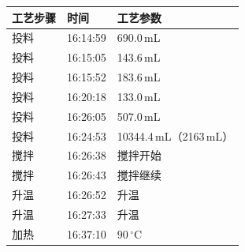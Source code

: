 \documentclass[UTF8,10pt,a4paper,fontset=fandol]{ctexart}
\newcommand{\fieldvalue}[1]{#1}
\begin{document}
\begin{tabularx}{\textwidth}{@{}l l X@{}}
\textbf{工艺步骤} & \textbf{时间} & \textbf{工艺参数} \\
\hline
投料 & 
\fieldvalue{16:14:59} &
\fieldvalue{690.0\,mL} \\

投料 & 
\fieldvalue{16:15:05} &
\fieldvalue{143.6\,mL} \\

投料 & 
\fieldvalue{16:15:52} &
\fieldvalue{183.6\,mL} \\

投料 & 
\fieldvalue{16:20:18} &
\fieldvalue{133.0\,mL} \\

投料 & 
\fieldvalue{16:26:05} &
\fieldvalue{507.0\,mL} \\

投料 & 
\fieldvalue{16:24:53} &
\fieldvalue{10344.4\,mL（2163\,mL）} \\

搅拌 & 
\fieldvalue{16:26:38} &
搅拌开始 \\

搅拌 & 
\fieldvalue{16:26:43} &
搅拌继续 \\

升温 & 
\fieldvalue{16:26:52} &
升温 \\

升温 & 
\fieldvalue{16:27:33} &
升温 \\

加热 & 
\fieldvalue{16:37:10} &
\fieldvalue{$90\,^{\circ}\mathrm{C}$} \\


\end{tabularx}
\end{document}
